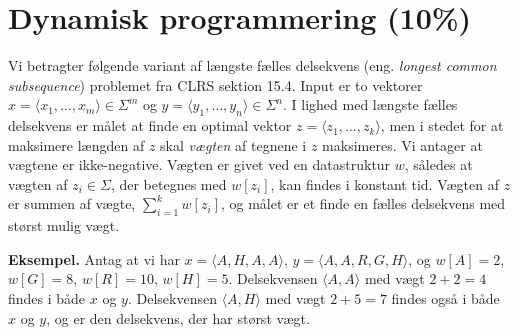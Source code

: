 \section{Dynamisk programmering (10\%)}

Vi betragter følgende variant af længste fælles delsekvens (eng. \emph{longest common subsequence}) problemet fra CLRS sektion 15.4.
Input er to vektorer $x=\langle x_1,\dots,x_m\rangle \in \Sigma^m$ og $y=\langle y_1,\dots,y_n\rangle \in \Sigma^n$.
I lighed med længste fælles delsekvens er målet at finde en optimal vektor $z=\langle z_1,\dots,z_k\rangle$, men i stedet for at maksimere længden af $z$ skal \emph{vægten} af tegnene i $z$ maksimeres.
Vi antager at vægtene er ikke-negative.
Vægten er givet ved en datastruktur $w$, således at vægten af $z_i \in\Sigma$, der betegnes med $w[z_i]$, kan findes i konstant tid.
Vægten af $z$ er summen af vægte, $\sum_{i=1}^k w[z_i]$, og målet er et finde en fælles delsekvens med størst mulig vægt.

\medskip

{\bf Eksempel.} Antag at vi har $x=\langle A, H, A, A \rangle$, $y=\langle A, A, R, G, H \rangle$, og $w[A] = 2$, $w[G]=8$, $w[R] = 10$, $w[H] = 5$. Delsekvensen $\langle A, A \rangle$ med vægt $2+2 = 4$ findes i både $x$ og $y$. Delsekvensen $\langle A, H \rangle$ med vægt $2+5 = 7$ findes også i både $x$ og $y$, og er den delsekvens, der har størst vægt.





